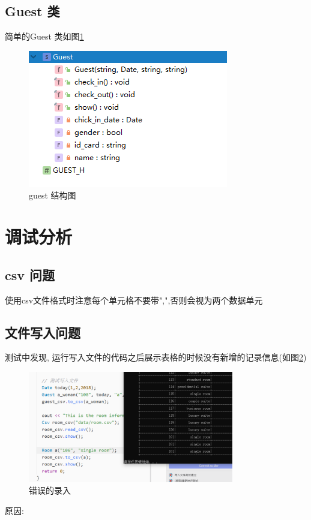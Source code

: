 \documentclass[UTF8]{ctexart}
\begin{document}
  \subsection{Guest 类}
    简单的Guest 类如图\ref{fig:structure_guest}
    \begin{figure}[H]
        \centering
        \includegraphics[scale = 1]{structure_guest.png}
        \caption{guest 结构图}
        \label{fig:structure_guest}
      \end{figure}
\section{调试分析}
  \subsection{csv 问题}
    使用csv文件格式时注意每个单元格不要带",",否则会视为两个数据单元

  \subsection{文件写入问题}
    测试中发现, 运行写入文件的代码之后展示表格的时候没有新增的记录信息(如图\ref{fig:bug_2})
    \begin{figure}[H]
      \centering
      \includegraphics[width=0.8\textwidth]{bug_2}
      \caption{错误的录入}
      \label{fig:bug_2}
    \end{figure}
    原因:
\end{document}
